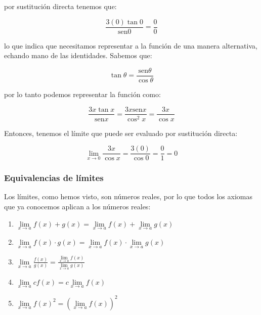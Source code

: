 \documentclass[
]{book}
\begin{document}
por sustitución directa tenemos que:

\begin{equation}
\frac{3(0)\tan 0}{\mathrm{sen} 0} = \frac{0}{0}
\end{equation}

lo que indica que necesitamos representar a la función de una manera alternativa, echando mano de las identidades. Sabemos que:

\begin{equation}
\tan \theta = \frac{\mathrm{sen} \theta}{\cos \theta}
\end{equation}

por lo tanto podemos representar la función como:

\begin{equation}
\frac{3x \tan x}{\mathrm{sen}x} = \frac{3x \mathrm{sen} x}{\cos^2 x} = \frac{3x}{\cos x}
\end{equation}

Entonces, tenemos el límite que puede ser evaluado por sustitución directa:

\begin{equation}
\lim \limits_{x \rightarrow 0} \frac{3x}{\cos x} = \frac{3(0)}{\cos 0} = \frac{0}{1} = 0
\end{equation}

\hypertarget{equivalencias-de-luxedmites}{%
\subsubsection{Equivalencias de límites}\label{equivalencias-de-luxedmites}}

Los límites, como hemos visto, son números reales, por lo que todos los axiomas que ya conocemos aplican a los números reales:

\begin{enumerate}
\def\labelenumi{\arabic{enumi}.}
\item
  \(\lim \limits_{x \rightarrow a} f(x) + g(x) = \lim \limits_{x \rightarrow a} f(x) + \lim \limits_{x \rightarrow a} g(x)\)
\item
  \(\lim \limits_{x \rightarrow a} f(x) \cdot g(x) = \lim \limits_{x \rightarrow a} f(x) \cdot \lim \limits_{x \rightarrow a} g(x)\)
\item
  \(\lim \limits_{x \rightarrow a} \frac{f(x)}{g(x)} = \frac{\lim \limits_{x \rightarrow a} f(x) }{ \lim \limits_{x \rightarrow a} g(x)}\)
\item
  \(\lim \limits_{x \rightarrow a} c f(x) = c \lim \limits_{x \rightarrow a} f(x)\)
\item
  \(\lim \limits_{x \rightarrow a} f(x)^2 = \left( \lim \limits_{x \rightarrow a} f(x) \right)^2\)
\end{enumerate}
\end{document}

